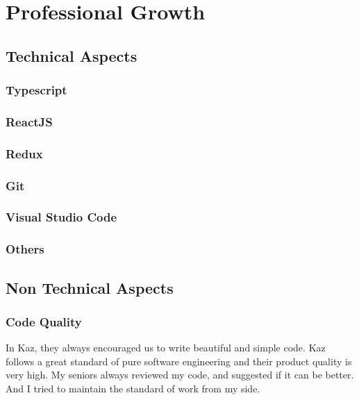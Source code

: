 \chapter{Professional Growth}

\section{Technical Aspects}

\subsection{Typescript}

\subsection{ReactJS}

\subsection{Redux}

\subsection{Git}

\subsection{Visual Studio Code}

\subsection{Others}



\section{Non Technical Aspects}

\subsection{Code Quality}

In Kaz, they always encouraged us to write beautiful and simple code.
Kaz follows a great standard of pure software engineering and their product quality is very high.
My seniors always reviewed my code, and suggested if it can be better.
And I tried to maintain the standard of work from my side.

